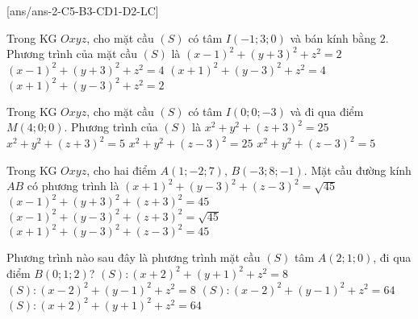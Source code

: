 \TN
{}[ans/ans-2-C5-B3-CD1-D2-LC]
\begin{ex}%
Trong KG $Oxyz$, cho mặt cầu $(S)$ có tâm $I(-1;3;0)$ và bán kính bằng $2$. Phương trình của mặt cầu $(S)$ là
\choice
{$(x-1)^2+(y+3)^2+z^2=2$}
{$(x-1)^2+(y+3)^2+z^2=4$}
{\True $(x+1)^2+(y-3)^2+z^2=4$}
{$(x+1)^2+(y-3)^2+z^2=2$}
\end{ex}

\begin{ex}%
Trong KG $Oxyz$, cho mặt cầu $(S)$ có tâm $I(0;0;-3)$ và đi qua điểm $M(4;0;0)$. Phương trình của $(S)$ là
\choice
{\True $x^2+y^2+(z+3)^2=25$}
{$x^2+y^2+(z+3)^2=5$}
{$x^2+y^2+(z-3)^2=25$}
{$x^2+y^2+(z-3)^2=5$}
\end{ex}

\begin{ex}%
Trong KG $Oxyz$, cho hai điểm $A(1;-2;7)$, $B(-3;8;-1)$. Mặt cầu đường kính $AB$ có phương trình là
\choice
{$(x+1)^2+(y-3)^2+(z-3)^2=\sqrt{45}$}
{$(x-1)^2+(y+3)^2+(z+3)^2=45$}
{$(x-1)^2+(y-3)^2+(z+3)^2=\sqrt{45}$}
{\True $(x+1)^2+(y-3)^2+(z-3)^2=45$}
\end{ex}

\begin{ex}%
Phương trình nào sau đây là phương trình mặt cầu $(S)$ tâm $A(2;1;0)$, đi qua điểm $B(0;1;2)$?
\choice
{$(S)\colon{(x+2)^2}+(y+1)^2+z^2=8$}
{\True $(S)\colon{(x-2)^2}+(y-1)^2+z^2=8$}
{$(S)\colon{(x-2)^2}+(y-1)^2+z^2=64$}
{$(S)\colon{(x+2)^2}+(y+1)^2+z^2=64$}
\end{ex}


